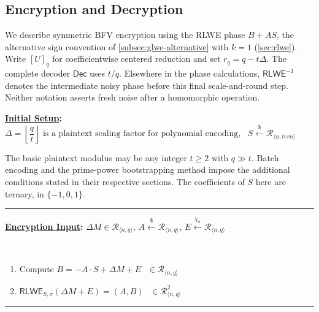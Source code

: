 \subsection{Encryption and Decryption}
\label{subsec:bfv-enc-dec}

We describe symmetric BFV encryption using the RLWE phase $B+AS$, the alternative sign convention of \autoref{subsec:glwe-alternative} with $k=1$ (\autoref{sec:rlwe}). Write $[U]_q$ for coefficientwise centered reduction and set $r_q=q-t\Delta$. The complete decoder $\textsf{Dec}$ uses $t/q$. Elsewhere in the phase calculations, $\textsf{RLWE}^{-1}$ denotes the intermediate noisy phase before this final scale-and-round step. Neither notation asserts fresh noise after a homomorphic operation.



\begin{tcolorbox}[title={\textbf{\tboxlabel{\ref*{subsec:bfv-enc-dec}} BFV Encryption and Decryption}}]

\textbf{\underline{Initial Setup}:} $\Delta=\left\lfloor\dfrac{q}{t}\right\rfloor \text{ is a plaintext scaling factor for polynomial encoding}, \text{ } S \xleftarrow{\$} \mathcal{R}_{\langle n, \textit{tern} \rangle}$

The basic plaintext modulus may be any integer $t\geq2$ with $q\gg t$. Batch encoding and the prime-power bootstrapping method impose the additional conditions stated in their respective sections. The coefficients of $S$ here are ternary, in $\{-1,0,1\}$.

\par\noindent\rule{\textwidth}{0.4pt}

\textbf{\underline{Encryption Input}:} $\Delta M \in \mathcal{R}_{\langle n, q \rangle}$, $A \xleftarrow{\$} \mathcal{R}_{\langle n, q \rangle}$, $E \xleftarrow{\chi_\sigma} \mathcal{R}_{\langle n, q \rangle}$


$ $

\begin{enumerate}


\item Compute $B = -A \cdot S + \Delta M + E \text{ } \in \mathcal{R}_{\langle n,q \rangle}$

\item $\textsf{RLWE}_{S,\sigma}(\Delta M + E) = (A, B) \text{ } \in \mathcal{R}_{\langle n,q \rangle}^2$ 

\end{enumerate}

\par\noindent\rule{\textwidth}{0.4pt}


\end{tcolorbox}
